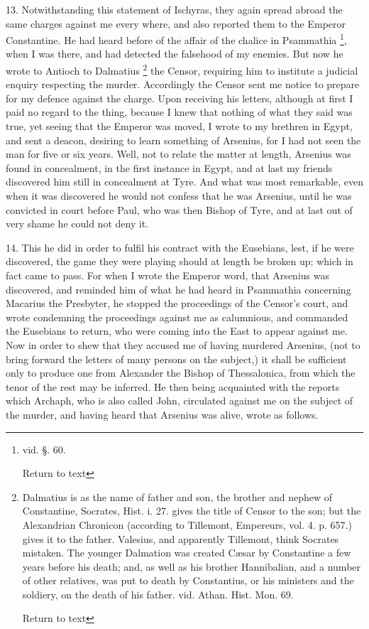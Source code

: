 13. Notwithstanding this statement of Ischyras,
they again spread abroad the same charges against me every where, and
also reported them to the Emperor Constantine. He had heard before of
the affair of the chalice in Psammathia \footnote{vid. §. 60.

Return to text}, when I was there, and had detected the falsehood of my
enemies. But now he wrote to Antioch to Dalmatius \footnote{Dalmatius is as the name of father and son, the brother and nephew of
Constantine, Socrates, Hist. i. 27. gives the title of Censor to the
son; but the Alexandrian Chronicon (according to Tillemont, Empereurs,
vol. 4. p. 657.) gives it to the father. Valesius, and apparently
Tillemont, think Socrates mistaken. The younger Dalmation was created
Cæsar by Constantine a few years before his death; and, as well as
his brother Hannibalian, and a number of other relatives, was put to
death by Constantius, or his ministers and the soldiery, on the death
of his father. vid. Athan. Hist. Mon. 69.

Return to text} the Censor, requiring him to institute a judicial enquiry
respecting the murder. Accordingly the Censor sent me notice to
prepare for my defence against the charge. Upon receiving his letters,
although at first I paid no regard to the thing, because I knew that
nothing of what they said was true, yet seeing that the Emperor was
moved, I wrote to my brethren in Egypt, and sent a deacon, desiring to
learn something of Arsenius, for I had not seen the man for five or
six years. Well, not to relate the matter at length, Arsenius was
found in concealment, in the first instance in Egypt, and at last my
friends discovered him still in concealment at Tyre. And what was most
remarkable, even when it was discovered he would not confess that he
was Arsenius, until he was convicted in court before Paul, who was
then Bishop of Tyre, and at last out of very shame he could not deny
it.

14. This he did in order to fulfil his contract
with the Eusebians, lest, if he were discovered, the game they were
playing should at length be broken up; which in fact came to pass. For
when I wrote the Emperor word, that Arsenius was discovered, and
reminded him of what he had heard in Psammathia concerning Macarius
the Presbyter, he stopped the proceedings of the Censor’s court, and
wrote condemning the proceedings against me as calumnious, and
commanded the Eusebians to return, who were coming into the East
to appear against me. Now in order to shew that they accused me of
having murdered Arsenius, (not to bring forward the letters of many
persons on the subject,) it shall be sufficient only to produce one
from Alexander the Bishop of Thessalonica, from which the tenor of the
rest may be inferred. He then being acquainted with the reports which
Archaph, who is also called John, circulated against me on the subject
of the murder, and having heard that Arsenius was alive, wrote as
follows.

